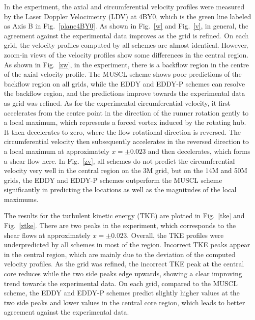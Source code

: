 In the experiment, the axial and circumferential velocity profiles were measured by the Laser Doppler Velocimetry (LDV) at 4BY0, which is the green line labeled as Axis B in Fig.~\ref{plane4BY0}. As shown in Fig.~\ref{w} and Fig.~\ref{v}, in general, the agreement against the experimental data improves as the grid is refined. On each grid, the velocity profiles computed by all schemes are almost identical. However, zoom-in views of the velocity profiles show some differences in the central region. As shown in Fig.~\ref{zw}, in the experiment, there is a backflow region in the centre of the axial velocity profile. The MUSCL scheme shows poor predictions of the backflow region on all grids, while the EDDY and EDDY-P schemes can resolve the backflow region, and the predictions improve towards the experimental data as grid was refined. As for the experimental circumferential velocity, it first accelerates from the centre point in the direction of the runner rotation gently to a local maximum, which represents a forced vortex induced by the rotating hub. It then decelerates to zero, where the flow rotational direction is reversed. The circumferential velocity then subsequently accelerates in the reversed direction to a local maximum at approximately $x=\pm 0.023$ and then decelerates, which forms a shear flow here. In Fig.~\ref{zv}, all schemes do not predict the circumferential velocity very well in the central region on the 3M grid, but on the 14M and 50M grids, the EDDY and EDDY-P schemes outperform the MUSCL scheme significantly in predicting the locations as well as the magnitudes of the local maximums. 

The results for the turbulent kinetic energy (TKE) are plotted in Fig.~\ref{tke} and Fig.~\ref{ztke}. There are two peaks in the experiment, which corresponds to the shear flows at approximately $x=\pm 0.023$. Overall, the TKE profiles were underpredicted by all schemes in most of the region. Incorrect TKE peaks appear in the central region, which are mainly due to the deviation of the computed velocity profiles. As the grid was refined, the incorrect TKE peak at the central core reduces while the two side peaks edge upwards, showing a clear improving trend towards the experimental data. On each grid, compared to the MUSCL scheme, the EDDY and EDDY-P schemes predict slightly higher values at the two side peaks and lower values in the central core region, which leads to better agreement against the experimental data. 

